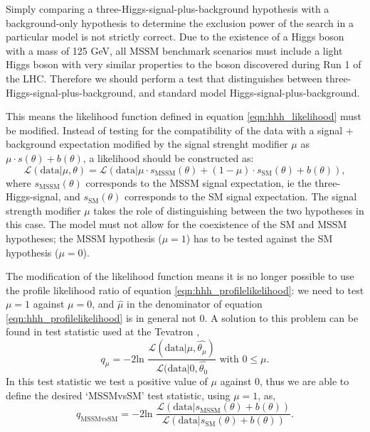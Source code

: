 Simply comparing a three-Higgs-signal-plus-background hypothesis with a background-only 
hypothesis to determine the exclusion power of the search in a particular
model is not strictly correct. Due to the existence of a Higgs boson with a 
mass of 125 GeV, all MSSM benchmark scenarios must include a light Higgs boson
with very similar properties to the boson discovered during Run 1 of the \ac{LHC}.
Therefore we should perform a test that distinguishes between three-Higgs-signal-plus-background, and
standard model Higgs-signal-plus-background.

This means the likelihood function defined in equation \ref{eqn:hhh_likelihood}
must be modified. Instead of testing for the compatibility of the data with
a signal + background expectation modified by the signal strenght modifier $\mu$ as
$\mu \cdot s(\theta) + b(\theta)$, a likelihood should be constructed as:
\begin{equation}\label{mssm_likelihood}
\mathcal{L}(\text{data}|\mu, \theta) = \mathcal{L}(\text{data}|\mu \cdot s_{\text{MSSM}}(\theta) + (1-\mu)\cdot s_{\text{SM}}(\theta) + b(\theta)),
\end{equation}
where $s_{\text{MSSM}}(\theta)$ corresponds to the MSSM signal expectation, ie the three-Higgs-signal, and $s_{\text{SM}}(\theta)$ 
corresponds to the SM signal expectation.
The signal strength modifier $\mu$ takes the role of distinguishing between
the two hypotheses in this case. The model must not allow for the coexistence 
of the SM and MSSM hypotheses; the MSSM hypothesis ($\mu=1$) has to be tested
against the SM hypothesis ($\mu=0$).

The modification of the likelihood function means it is no longer possible
to use the profile likelihood ratio of equation \ref{eqn:hhh_profilelikelihood}:
we need to test $\mu=1$ against $\mu=0$, and 
$\hat{\mu}$ in the denominator of equation \ref{eqn:hhh_profilelikelihood} is in 
general not 0. A solution to this problem can be found in test statistic used at the Tevatron \cite{LHCHComb2011},
\begin{equation}\label{eqn:mssm_tevatron_teststat}
q_{\mu} = -2\text{ln }\frac{\mathcal{L}(\text{data}|\mu,\hat{\theta_{\mu}})}{\mathcal{L}(\text{data}|0,\hat{\theta_0}} \text{ with } 0\leq\mu.
\end{equation}
In this test statistic we test a positive value of $\mu$ against 0, thus we are able to define
the desired `MSSMvsSM' test statistic, using $\mu=1$, as,
\begin{equation}\label{eqn:mssm_mssmvssm_stat}
q_{\text{MSSMvsSM}} = -2\text{ln }\frac{\mathcal{L}(\text{data}|s_{\text{MSSM}}(\theta) + b(\theta))}{\mathcal{L}(\text{data}|s_{\text{SM}}(\theta)+b(\theta))}.
\end{equation}


